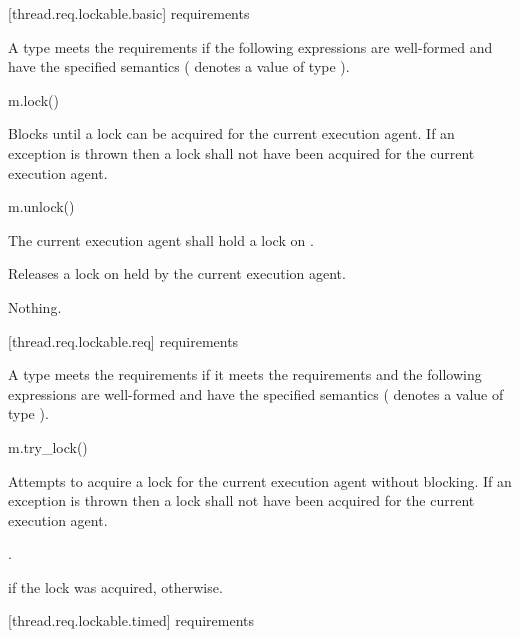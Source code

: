 [thread.req.lockable.basic]{ requirements}

\pnum
A type  meets the  requirements if the following expressions are
well-formed and have the specified semantics ( denotes a value of type ).

\begin{itemdecl}
m.lock()
\end{itemdecl}

\begin{itemdescr}
\pnum
\effects Blocks until a lock can be acquired for the current execution agent. If an exception
is thrown then a lock shall not have been acquired for the current execution agent.
\end{itemdescr}

\begin{itemdecl}
m.unlock()
\end{itemdecl}

\begin{itemdescr}
\pnum
\requires The current execution agent shall hold a lock on .

\pnum
\effects Releases a lock on  held by the current execution agent.

\pnum
\throws Nothing.
\end{itemdescr}

[thread.req.lockable.req]{ requirements}

\pnum
A type  meets the  requirements if it meets the 
requirements and the following expressions are well-formed and have the specified semantics
( denotes a value of type ).

\begin{itemdecl}
m.try_lock()
\end{itemdecl}

\begin{itemdescr}
\pnum
\effects Attempts to acquire a lock for the current execution agent without blocking. If an
exception is thrown then a lock shall not have been acquired for the current execution agent.

\pnum
\returntype {}.

\pnum
\returns {} if the lock was acquired,  otherwise.
\end{itemdescr}

[thread.req.lockable.timed]{ requirements}

